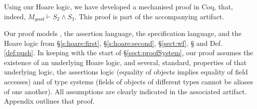 Using our Hoare logic, we have developed a mechanised proof in Coq, that, indeed, $M_{good} \vdash S_2 \wedge S_3$.
This proof is  part of the accompanying artifact. 
 
 Our proof models  \LangOO, the assertion language, the specification language, and the Hoare logic from \S \ref{s:hoare:first},  \S   \ref{s:hoare:second},  \S  \ref{sect:wf},  \S {} and Def. \ref{def:push}.
In keeping with   the start of  \S \ref{sect:proofSystem}, our proof assumes the existence of an underlying Hoare logic,  
and several, standard, properties of that underlying logic, the assertions logic (\eg equality of objects implies equality of field accesses) and of type systems
(\eg  fields of objects of different types cannot be aliases of one another).
All assumptions  are clearly indicated in the associated artifact.
 Appendix   %
outlines   that proof. 

